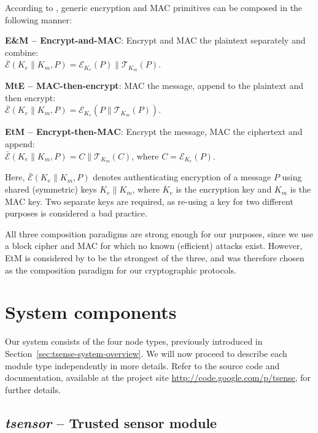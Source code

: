 According to , generic encryption and MAC primitives can be composed in the following manner:
%
\begin{description}
\item \textbf{E\&M -- Encrypt-and-MAC}: Encrypt and MAC the plaintext separately and combine:\\ $\bar{\mathcal{E}}(K_e \parallel K_m,P) = \mathcal{E}_{K_e}(P) \parallel \mathcal{T}_{K_m}(P)$.
\item \textbf{MtE -- MAC-then-encrypt}: MAC the message, append to the plaintext and then encrypt:\\ $\bar{\mathcal{E}}(K_e \parallel K_m,P) =\mathcal{E}_{K_e}(P \parallel \mathcal{T}_{K_m}(P))$.
\item \textbf{EtM -- Encrypt-then-MAC}: Encrypt the message, MAC the ciphertext and append:\\ $\bar{\mathcal{E}}(K_e \parallel K_m,P) = C \parallel \mathcal{T}_{K_m}(C)$, where $C=\mathcal{E}_{K_e}(P)$.
\end{description}
%
Here, $\bar{\mathcal{E}}(K_e \parallel K_m,P)$ denotes authenticating encryption of a message $P$ using shared (symmetric) keys $K_e \parallel K_m$, where $K_e$ is the encryption key and $K_m$ is the MAC key. Two separate keys are required, as re-using a key for two different purposes is considered a bad practice.

All three composition paradigms are strong enough for our purposes, since we use a block cipher and MAC for which no known (efficient) attacks exist. However, EtM is considered by \citeauthor{bellare2007} to be the strongest of the three, and was therefore chosen as the composition paradigm for our cryptographic protocols.

\section{System components}

Our system consists of the four node types, previously introduced in Section~\ref{sec:tsense-system-overview}. We will now proceed to describe each module type independently in more details. Refer to the source code and documentation, available at the project site \url{http://code.google.com/p/tsense}, for further details.

\subsection{\textit{tsensor} -- Trusted sensor module}
\label{tsensor}

